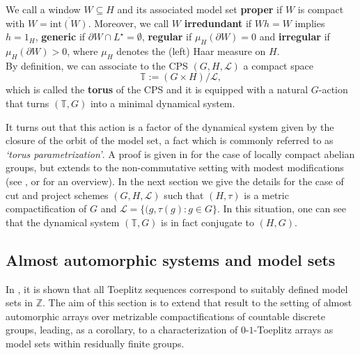 \documentclass[titlepage,reqno,10pt]{amsart}
\newtheorem{proposition}[theorem]{Proposition}
\theoremstyle{definition}
\def\T{{\mathbb T}}
\newcommand{\ol}[1]{\overline{#1}}
\begin{document}

We call a window $W\subseteq H$ and its associated model set \textbf{proper} if $W$ is compact with $W=\ol{\mathrm{int}(W)}$.
Moreover, we call $W$ {\bf irredundant} if $Wh = W$ implies $h=1_H$, {\bf generic} if $\partial W \cap L^\star = \emptyset$, {\bf regular} if $\mu_H(\partial W)=0$ and {\bf irregular} if $\mu_H(\partial W)>0$, where $\mu_H$ denotes the (left) Haar measure on $H$. \\[5pt]
By definition, we can associate to the CPS $(G,H,\mathcal{L})$ a compact space
$$ \T := (G\times H)/ \mathcal{L},$$
which is called the {\bf torus} of the CPS and it is equipped with a natural $G$-action that turns $(\T,G)$ into a minimal dynamical system.

It turns out that this action is a factor of the dynamical system given by the closure of the orbit of the model set, a fact which is commonly referred to as {\em `torus parametrization'}. A proof is given in \cite{BaLeMo07}  for the case of locally compact abelian groups, but extends to the non-commutative setting with modest modifications (see \cite{BjHaPo18}, or \cite{DJL} for an overview). 
In the next section we give the details for the case of cut and project schemes $(G,H,\mathcal{L})$ such that $(H,\tau)$ is a metric compactification of $G$ and $\mathcal{L}=\{(g,\tau(g): g\in G\}$.
In this situation, one can see that the dynamical system $(\T,G)$ is in fact conjugate to $(H,G)$.

\subsection{Almost automorphic systems and model sets}\label{sec: almost auto as model set} In \cite{BaJäLe16}, it is shown that all Toeplitz sequences correspond to suitably defined model sets in $\mathbb{Z}$. The aim of this section is to extend that result to the setting of almost automorphic arrays over metrizable compactifications of countable discrete groups, leading, as a corollary, to a characterization of $0$-$1$-Toeplitz arrays as model sets within residually finite groups.
 
\end{document}

